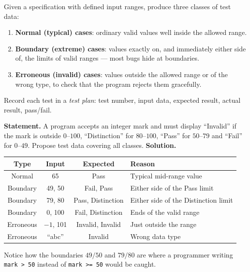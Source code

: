 \documentclass[11pt]{article}
\begin{document}
\begin{methode}
Given a specification with defined input ranges, produce three classes of test data:
\begin{enumerate}
\item \textbf{Normal (typical) cases}: ordinary valid values well inside the allowed range.
\item \textbf{Boundary (extreme) cases}: values exactly on, and immediately either side of, the limits of valid ranges — most bugs hide at boundaries.
\item \textbf{Erroneous (invalid) cases}: values outside the allowed range or of the wrong type, to check that the program rejects them gracefully.
\end{enumerate}
Record each test in a \emph{test plan}: test number, input data, expected result, actual result, pass/fail.
\end{methode}

\begin{exoresolu}
\textbf{Statement.} A program accepts an integer mark and must display ``Invalid'' if the mark is outside $0$--$100$, ``Distinction'' for $80$--$100$, ``Pass'' for $50$--$79$ and ``Fail'' for $0$--$49$. Propose test data covering all classes.
\tcblower
\textbf{Solution.}
\begin{center}
\begin{tabular}{|c|c|c|l|}
\hline
\rowcolor{popblueL} \textbf{Type} & \textbf{Input} & \textbf{Expected} & \textbf{Reason} \\
\hline
Normal & 65 & Pass & Typical mid-range value \\
\hline
Boundary & 49, 50 & Fail, Pass & Either side of the Pass limit \\
\hline
Boundary & 79, 80 & Pass, Distinction & Either side of the Distinction limit \\
\hline
Boundary & 0, 100 & Fail, Distinction & Ends of the valid range \\
\hline
Erroneous & $-1$, 101 & Invalid, Invalid & Just outside the range \\
\hline
Erroneous & ``abc'' & Invalid & Wrong data type \\
\hline
\end{tabular}
\end{center}
Notice how the boundaries $49/50$ and $79/80$ are where a programmer writing \texttt{mark > 50} instead of \texttt{mark >= 50} would be caught.
\end{exoresolu}
\end{document}
